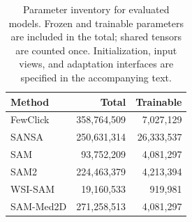 \begin{table}[!htbp]
\centering
\caption{Parameter inventory for evaluated models. Frozen and trainable parameters are included in the total; shared tensors are counted once. Initialization, input views, and adaptation interfaces are specified in the accompanying text.}
\label{tab:protocol}
\small
\setlength{\tabcolsep}{4pt}
\begin{tabular}{@{}lrr@{}}
\toprule
Method & Total & Trainable \\
\midrule
FewClick & 358,764,509 & 7,027,129 \\
SANSA & 250,631,314 & 26,333,537 \\
SAM & 93,752,209 & 4,081,297 \\
SAM2 & 224,463,379 & 4,213,394 \\
WSI-SAM & 19,160,533 & 919,981 \\
SAM-Med2D & 271,258,513 & 4,081,297 \\
\bottomrule
\end{tabular}
\end{table}
